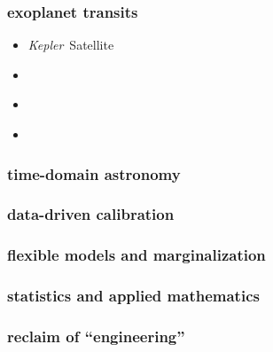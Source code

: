 \documentclass{beamer}
\newcommand{\project}[1]{\textsl{#1}}
\newcommand{\Kepler}{\project{Kepler}}
\begin{document}
\begin{frame}
  \frametitle{exoplanet transits}
  \begin{itemize}
  \item \Kepler\ Satellite
  \item ~
  \item ~
  \item ~
  \end{itemize}
\end{frame}

\begin{frame}
  \frametitle{time-domain astronomy}
\end{frame}

\begin{frame}
  \frametitle{data-driven calibration}
\end{frame}

\begin{frame}
  \frametitle{flexible models and marginalization}
\end{frame}

\begin{frame}
  \frametitle{statistics and applied mathematics}
\end{frame}

\begin{frame}
  \frametitle{reclaim of ``engineering''}
\end{frame}
\end{document}
